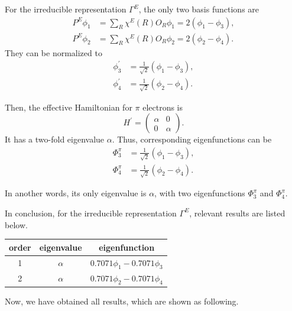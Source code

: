\documentclass[a4paper]{book}
\begin{document}
\begin{solution}
\begin{enumerate}[label=(\alph*)]
		For the irreducible representation $\Gamma^{E}$, the only two basis functions are
		\begin{align*}
			P^{E}\phi_1 &= \sum_{R} \chi^{E}(R) O_R \phi_1 = 2(\phi_1 - \phi_3 ), \\
			P^{E}\phi_2 &= \sum_{R} \chi^{E}(R) O_R \phi_2 = 2(\phi_2 - \phi_4 ).	
		\end{align*}
		They can be normalized to
		\begin{align*}
			\phi^\prime_3 &= \frac{1}{\sqrt{2}}(\phi_1 - \phi_3), \\
			\phi^\prime_4 &= \frac{1}{\sqrt{2}}(\phi_2 - \phi_4).
		\end{align*}
		
		Then, the effective Hamiltonian for $\pi$ electrons is
		\begin{equation*}
			H^\prime = \begin{pmatrix}
				\alpha	&	0	\\
				0	&	\alpha
				\end{pmatrix}.				
		\end{equation*}
		It has a two-fold eigenvalue $\alpha$. Thus, corresponding eigenfunctions can be
		\begin{align}
			\Phi^\pi_3 &= \frac{1}{\sqrt{2}}(\phi_1 - \phi_3), \\
			\Phi^\pi_4 &= \frac{1}{\sqrt{2}}(\phi_2 - \phi_4).
		\end{align}
		
		In another words, its only eigenvalue is $\alpha$, with two eigenfunctions $\Phi^\pi_3$ and $\Phi^\pi_4$.
		
		In conclusion, for the irreducible representation $\Gamma^{E}$, relevant results are listed below.
		
		\begin{center}
		\setlength{\abovecaptionskip}{0em}
		\begin{tabular}{ccc}\hline
		  order	&	eigenvalue		& 	eigenfunction	\\ \hline
			1	&$\alpha$& 	$0.7071\phi_1 - 0.7071 \phi_3$ \\ 
			2	&$\alpha$& 	$0.7071\phi_2 - 0.7071 \phi_4$ \\\hline
		\end{tabular}
		\end{center}
		
		Now, we have obtained all results, which are shown as following.
		

\end{enumerate}
\end{solution}
\end{document}
